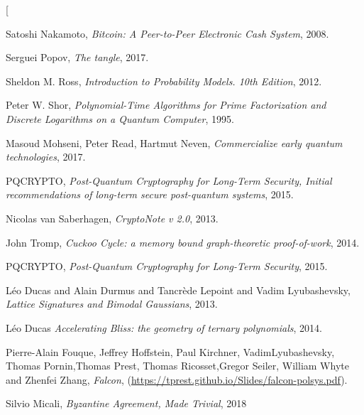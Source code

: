 \documentclass[a4paper,10pt,twocolumn]{article}
\begin{document}
	
	
	 
	\twocolumn[
		\begin{@twocolumnfalse}
	
	
	  \begin{thebibliography}{99}
		
			Satoshi Nakamoto,
			\emph{Bitcoin: A Peer-to-Peer Electronic Cash System}, 2008.
		
		Serguei Popov,
			\emph{The tangle}, 2017.
		
		Sheldon M. Ross,
			\emph{Introduction to Probability Models. 10th Edition}, 2012.
		
				
		Peter W. Shor, 
			\emph{Polynomial-Time Algorithms for Prime Factorization and Discrete Logarithms on a Quantum Computer}, 1995.
			
		Masoud Mohseni, Peter Read, Hartmut Neven,
			\emph{Commercialize early quantum technologies}, 2017.
			
		PQCRYPTO,
			\emph{Post-Quantum Cryptography for Long-Term Security, Initial recommendations of long-term secure post-quantum
			systems}, 2015.
				
		Nicolas van Saberhagen,
			\emph{CryptoNote v 2.0}, 2013.
	
		John Tromp,
			\emph{Cuckoo Cycle: a memory bound graph-theoretic proof-of-work}, 2014.
	
			PQCRYPTO,
				\emph{Post-Quantum Cryptography for Long-Term Security}, 2015.	
		
			L\'{e}o Ducas and Alain Durmus and Tancr\`{e}de Lepoint and Vadim Lyubashevsky,
				\emph{Lattice Signatures and Bimodal Gaussians}, 2013.
		
		L\'{e}o Ducas 
				\emph{Accelerating Bliss\@: the geometry of ternary polynomials}, 2014.		

		Pierre-Alain Fouque, Jeffrey Hoffstein, Paul Kirchner, VadimLyubashevsky, Thomas Pornin,Thomas Prest, Thomas Ricosset,Gregor Seiler, William Whyte and Zhenfei Zhang,
				\emph{Falcon}, (\url{https://tprest.github.io/Slides/falcon-polsys.pdf}).

		Silvio Micali,
				\emph{Byzantine Agreement, Made Trivial}, 2018
			

\end{thebibliography}
\end{@twocolumnfalse}
\end{document}
